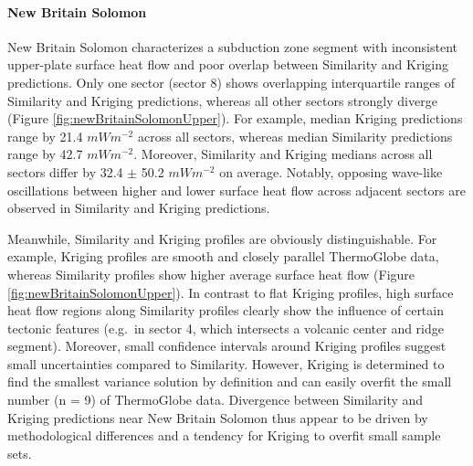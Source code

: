\hypertarget{new-britain-solomon}{%
\paragraph{New Britain Solomon}\label{new-britain-solomon}}

New Britain Solomon characterizes a subduction zone segment with inconsistent upper-plate surface heat flow and poor overlap between Similarity and Kriging predictions. Only one sector (sector 8) shows overlapping interquartile ranges of Similarity and Kriging predictions, whereas all other sectors strongly diverge (Figure \ref{fig:newBritainSolomonUpper}). For example, median Kriging predictions range by 21.4 \(mWm^{-2}\) across all sectors, whereas median Similarity predictions range by 42.7 \(mWm^{-2}\). Moreover, Similarity and Kriging medians across all sectors differ by 32.4 \(\pm\) 50.2 \(mWm^{-2}\) on average. Notably, opposing wave-like oscillations between higher and lower surface heat flow across adjacent sectors are observed in Similarity and Kriging predictions.

Meanwhile, Similarity and Kriging profiles are obviously distinguishable. For example, Kriging profiles are smooth and closely parallel ThermoGlobe data, whereas Similarity profiles show higher average surface heat flow (Figure \ref{fig:newBritainSolomonUpper}). In contrast to flat Kriging profiles, high surface heat flow regions along Similarity profiles clearly show the influence of certain tectonic features (e.g.~in sector 4, which intersects a volcanic center and ridge segment). Moreover, small confidence intervals around Kriging profiles suggest small uncertainties compared to Similarity. However, Kriging is determined to find the smallest variance solution by definition and can easily overfit the small number (n = 9) of ThermoGlobe data. Divergence between Similarity and Kriging predictions near New Britain Solomon thus appear to be driven by methodological differences and a tendency for Kriging to overfit small sample sets.



